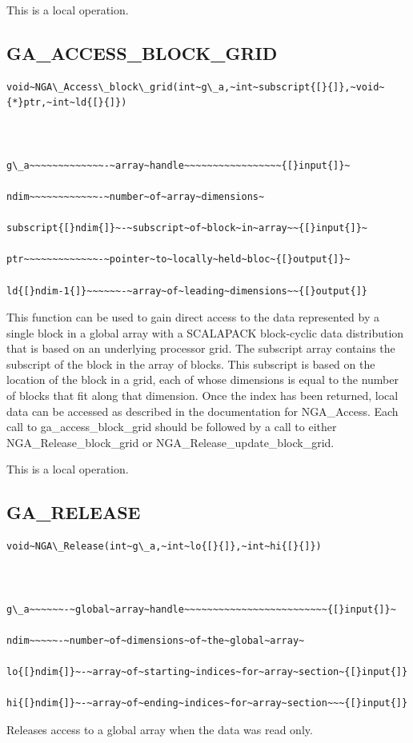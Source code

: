 This is a local operation. 


\subsection*{\label{sub:GA_ACCESS_BLOCK_GRID}GA\_ACCESS\_BLOCK\_GRID}
\begin{verbatim}
void~NGA\_Access\_block\_grid(int~g\_a,~int~subscript{[}{]},~void~{*}ptr,~int~ld{[}{]})



g\_a~~~~~~~~~~~~~-~array~handle~~~~~~~~~~~~~~~~~{[}input{]}~

ndim~~~~~~~~~~~~-~number~of~array~dimensions~

subscript{[}ndim{]}~-~subscript~of~block~in~array~~{[}input{]}~

ptr~~~~~~~~~~~~~-~pointer~to~locally~held~bloc~{[}output{]}~

ld{[}ndim-1{]}~~~~~~-~array~of~leading~dimensions~~{[}output{]}
\end{verbatim}
This function can be used to gain direct access to the data represented
by a single block in a global array with a SCALAPACK block-cyclic
data distribution that is based on an underlying processor grid. The
subscript array contains the subscript of the block in the array of
blocks. This subscript is based on the location of the block in a
grid, each of whose dimensions is equal to the number of blocks that
fit along that dimension. Once the index has been returned, local
data can be accessed as described in the documentation for NGA\_Access.
Each call to ga\_access\_block\_grid should be followed by a call
to either NGA\_Release\_block\_grid or NGA\_Release\_update\_block\_grid.

This is a local operation.


\subsection*{\label{sub:GA_RELEASE}GA\_RELEASE}
\begin{verbatim}
void~NGA\_Release(int~g\_a,~int~lo{[}{]},~int~hi{[}{]})



g\_a~~~~~~-~global~array~handle~~~~~~~~~~~~~~~~~~~~~~~~~{[}input{]}~

ndim~~~~~-~number~of~dimensions~of~the~global~array~

lo{[}ndim{]}~-~array~of~starting~indices~for~array~section~{[}input{]}

hi{[}ndim{]}~-~array~of~ending~indices~for~array~section~~~{[}input{]}
\end{verbatim}
Releases access to a global array when the data was read only.

